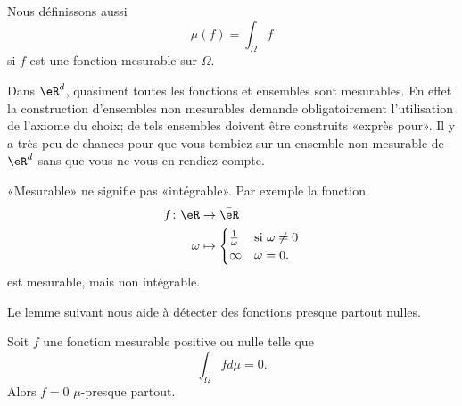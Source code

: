 Nous définissons aussi
\begin{equation}
    \mu(f)=\int_{\Omega}f
\end{equation}
si \( f\) est une fonction mesurable sur \( \Omega\).

\begin{remark}
    Dans \( \eR^d\), quasiment toutes les fonctions et ensembles sont mesurables. En effet la construction d'ensembles non mesurables demande obligatoirement l'utilisation de l'axiome du choix; de tels ensembles doivent être construits «exprès pour». Il y a très peu de chances pour que vous tombiez sur un ensemble non mesurable de \( \eR^d\) sans que vous ne vous en rendiez compte.
\end{remark}

\begin{remark}
    «Mesurable» ne signifie pas «intégrable». Par exemple la fonction 
    \begin{equation}
        \begin{aligned}
            f\colon \eR&\to \bar\eR \\
            \omega&\mapsto\begin{cases}
            \frac{1}{ \omega }    &   \text{si $ \omega\neq 0$}\\
            \infty    &    \text{$\omega=0$}.
            \end{cases}
        \end{aligned}
    \end{equation}
    est mesurable, mais non intégrable.
\end{remark}

Le lemme suivant nous aide à détecter des fonctions presque partout nulles.
\begin{lemma}   \label{Lemfobnwt}
    Soit \( f\) une fonction mesurable positive ou nulle telle que
    \begin{equation}
        \int_{\Omega}fd\mu=0.
    \end{equation}
    Alors \( f=0\) \( \mu\)-presque partout.
\end{lemma}

